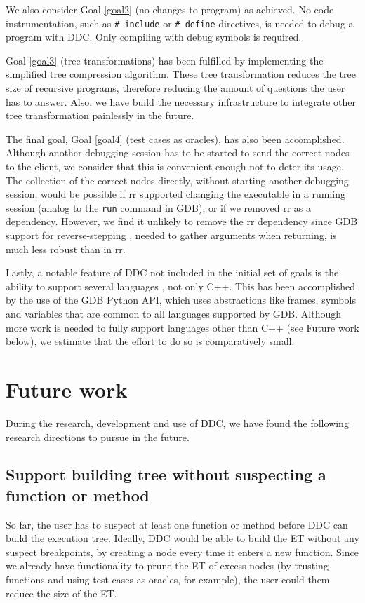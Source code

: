 We also consider Goal \ref{goal2} (no changes to program) as achieved. No code instrumentation, such as \verb|# include| or \verb|# define| directives, is needed to debug a program with DDC. Only compiling with debug symbols is required.

Goal \ref{goal3} (tree transformations) has been fulfilled by implementing the simplified tree compression algorithm. These tree transformation reduces the tree size of recursive programs, therefore reducing the amount of questions the user has to answer. Also, we have build the necessary infrastructure to integrate other tree transformation painlessly in the future.

The final goal, Goal \ref{goal4} (test cases as oracles), has also been accomplished. Although another debugging session has to be started to send the correct nodes to the client, we consider that this is convenient enough not to deter its usage. The collection of the correct nodes directly, without starting another debugging session, would be possible if rr supported changing the executable in a running session (analog to the \verb|run| command in GDB), or if we removed rr as a dependency. However, we find it unlikely to remove the rr dependency since GDB support for reverse-stepping \cite{ReverseExecution_GDB}, needed to gather arguments when returning, is much less robust than in rr.

Lastly, a notable feature of DDC not included in the initial set of goals is the ability to support several languages \cite{SupportedLanguaged_GDB}, not only C++. This has been accomplished by the use of the GDB Python API, which uses abstractions like frames, symbols and variables that are common to all languages supported by GDB. Although more work is needed to fully support languages other than C++ (see Future work below), we estimate that the effort to do so is comparatively small.
\section{Future work}
During the research, development and use of DDC, we have found the following research directions to pursue in the future.

\subsection{Support building tree without suspecting a function or method}
So far, the user has to suspect at least one function or method before DDC can build the execution tree.
Ideally, DDC would be able to build the ET without any suspect breakpoints, by creating a node every time it enters a new function.
Since we already have functionality to prune the ET of excess nodes (by trusting functions and using test cases as oracles, for example), the user could them reduce the size of the ET.

